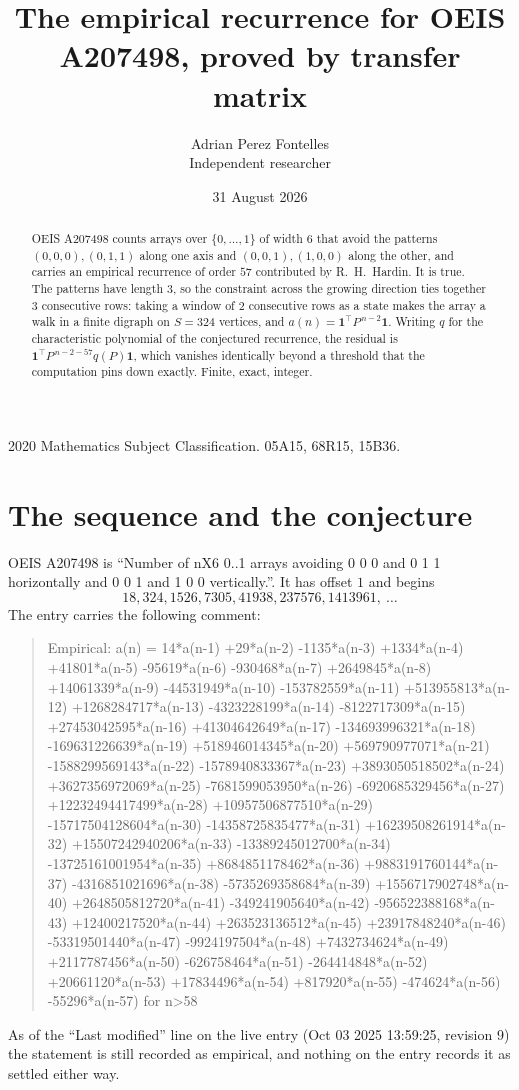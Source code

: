 \documentclass[11pt,a4paper]{article}
\title{The empirical recurrence for OEIS A207498, proved by transfer matrix}
\author{Adrian Perez Fontelles\\ \small Independent researcher}
\date{31 August 2026}
\theoremstyle{plain}
\theoremstyle{definition}
\begin{document}
\maketitle

\begin{abstract}
OEIS A207498 counts arrays over $\{0,\dots,1\}$ of width $6$ that avoid the patterns
$(0,0,0), (0,1,1)$ along one axis and $(0,0,1), (1,0,0)$ along the other, and carries an empirical recurrence of
order $57$ contributed by R.~H.~Hardin. It is true. The patterns have length $3$, so
the constraint across the growing direction ties together $3$ consecutive rows: taking a
window of $2$ consecutive rows as a state makes the array a walk in a finite digraph
on $S=324$ vertices, and $a(n)=\mathbf{1}^{\!\top}P^{\,n-2}\mathbf{1}$. Writing $q$
for the characteristic polynomial of the conjectured recurrence, the residual is
$\mathbf{1}^{\!\top}P^{\,n-2-57}q(P)\mathbf{1}$, which vanishes identically
beyond a threshold that the computation pins down exactly. Finite, exact, integer.
\end{abstract}

\noindent\small 2020 Mathematics Subject Classification. 05A15, 68R15, 15B36.\normalsize

\section{The sequence and the conjecture}

OEIS A207498 is ``Number of nX6 0..1 arrays avoiding 0 0 0 and 0 1 1 horizontally and 0 0 1 and 1 0 0 vertically.''. It has offset
$1$ and begins
\[
18, 324, 1526, 7305, 41938, 237576, 1413961,\ \dots
\]
The entry carries the following comment:
\begin{quote}\small
Empirical: a(n) = 14*a(n-1) +29*a(n-2) -1135*a(n-3) +1334*a(n-4) +41801*a(n-5) -95619*a(n-6) -930468*a(n-7) +2649845*a(n-8) +14061339*a(n-9) -44531949*a(n-10) -153782559*a(n-11) +513955813*a(n-12) +1268284717*a(n-13) -4323228199*a(n-14) -8122717309*a(n-15) +27453042595*a(n-16) +41304642649*a(n-17) -134693996321*a(n-18) -169631226639*a(n-19) +518946014345*a(n-20) +569790977071*a(n-21) -1588299569143*a(n-22) -1578940833367*a(n-23) +3893050518502*a(n-24) +3627356972069*a(n-25) -7681599053950*a(n-26) -6920685329456*a(n-27) +12232494417499*a(n-28) +10957506877510*a(n-29) -15717504128604*a(n-30) -14358725835477*a(n-31) +16239508261914*a(n-32) +15507242940206*a(n-33) -13389245012700*a(n-34) -13725161001954*a(n-35) +8684851178462*a(n-36) +9883191760144*a(n-37) -4316851021696*a(n-38) -5735269358684*a(n-39) +1556717902748*a(n-40) +2648505812720*a(n-41) -349241905640*a(n-42) -956522388168*a(n-43) +12400217520*a(n-44) +263523136512*a(n-45) +23917848240*a(n-46) -53319501440*a(n-47) -9924197504*a(n-48) +7432734624*a(n-49) +2117787456*a(n-50) -626758464*a(n-51) -264414848*a(n-52) +20661120*a(n-53) +17834496*a(n-54) +817920*a(n-55) -474624*a(n-56) -55296*a(n-57) for n>58
\end{quote}
As of the ``Last modified'' line on the live entry (Oct 03 2025 13:59:25, revision
9) the statement is still recorded as empirical, and nothing on the entry
records it as settled either way.
\end{document}
